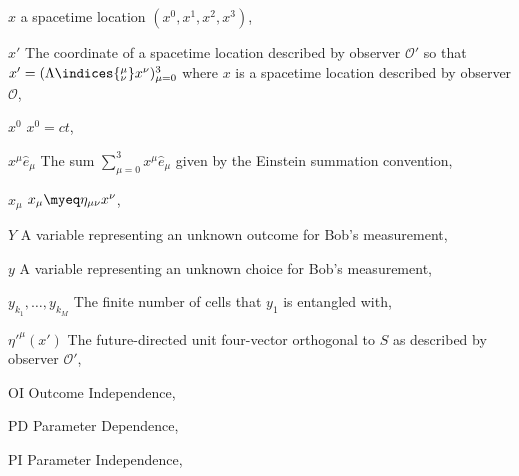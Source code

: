 \begin{thenomenclature}
      \item [{$x$}]\begingroup a spacetime location $(x^0,x^1,x^2,x^3)$, \nomrefpage{}
      \item [{$x'$}]\begingroup The coordinate of a spacetime location described by observer $\mathcal{O}'$ so that $x'=(\Lambda\indices{^\mu_\nu}x^\nu)_{\mu=0}^3$ where $x$ is a spacetime location described by observer $\mathcal{O}$, \nomrefpage{}
      \item [{$x^0$}]\begingroup $x^0=c t$, \nomrefpage{}
      \item [{$x^\mu\hat{e}_\mu$}]\begingroup The sum $\sum_{\mu=0}^3x^\mu\hat{e}_\mu$ given by the Einstein summation convention, \nomrefpage{}
      \item [{$x_\mu$}]\begingroup $x_\mu\myeq\eta_{\mu\nu}x^\nu$, \nomrefpage{}
      \item [{$Y$}]\begingroup A variable representing an unknown outcome for Bob's measurement, \nomrefpage{}
      \item [{$y$}]\begingroup A variable representing an unknown choice for Bob's measurement, \nomrefpage{}
      \item [{$y_{k_1}, \ldots, y_{k_M}$}]\begingroup The finite number of cells that $y_1$ is entangled with, \nomrefpage{}
      \item [{${\eta'}^\mu(x')$}]\begingroup The future-directed unit four-vector orthogonal to $S$ as described by observer $\mathcal{O}'$, \nomrefpage{}
      \item [{OI}]\begingroup Outcome Independence, \nomrefpage{}
      \item [{PD}]\begingroup Parameter Dependence, \nomrefpage{}
      \item [{PI}]\begingroup Parameter Independence, \nomrefpage{}
    
    \end{thenomenclature}
    